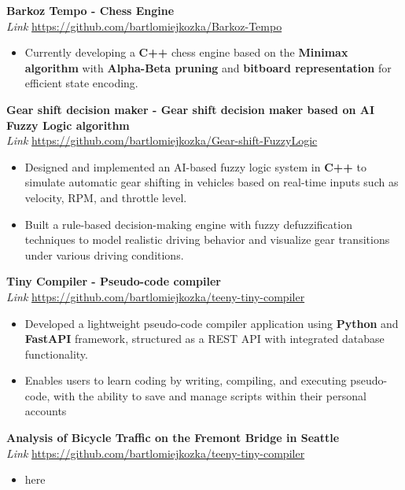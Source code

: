 \documentclass{article}
\begin{document}
\noindent\textbf{Barkoz Tempo - Chess Engine} \\
\textit{Link}
\href{https://github.com/bartlomiejkozka/Barkoz-Tempo}{https://github.com/bartlomiejkozka/Barkoz-Tempo}
\begin{itemize}[itemsep=-3pt, topsep=3pt]
    \item Currently developing a \textbf{C++} chess engine based on the \textbf{Minimax algorithm} with \textbf{Alpha-Beta pruning} and \textbf{bitboard representation} for efficient state encoding.
\end{itemize}

\noindent\textbf{Gear shift decision maker - Gear shift decision maker based on AI Fuzzy Logic algorithm} \\
\textit{Link}
\href{https://github.com/bartlomiejkozka/Gear-shift-FuzzyLogic}{https://github.com/bartlomiejkozka/Gear-shift-FuzzyLogic}
\begin{itemize}[itemsep=-3pt, topsep=3pt]
    \item Designed and implemented an AI-based fuzzy logic system in \textbf{C++} to simulate automatic gear shifting in vehicles based on real-time inputs such as velocity, RPM, and throttle level.
    \item Built a rule-based decision-making engine with fuzzy defuzzification techniques to model realistic driving behavior and visualize gear transitions under various driving conditions.
\end{itemize}

\noindent\textbf{Tiny Compiler - Pseudo-code compiler} \\
\textit{Link}
\href{https://github.com/bartlomiejkozka/teeny-tiny-compiler}{https://github.com/bartlomiejkozka/teeny-tiny-compiler}
\begin{itemize}[itemsep=-3pt, topsep=3pt]
    \item Developed a lightweight pseudo-code compiler application using \textbf{Python} and \textbf{FastAPI}
          framework, structured as a REST API with integrated database functionality.
    \item Enables users to learn coding by writing, compiling, and executing pseudo-code, with the
          ability to save and manage scripts within their personal accounts
\end{itemize}

\noindent\textbf{Analysis of Bicycle Traffic on the Fremont Bridge in Seattle} \\
\textit{Link}
\href{https://github.com/bartlomiejkozka/teeny-tiny-compiler}{https://github.com/bartlomiejkozka/teeny-tiny-compiler}
\begin{itemize}[itemsep=-3pt, topsep=3pt]
    \item here
\end{itemize}
\end{document}
